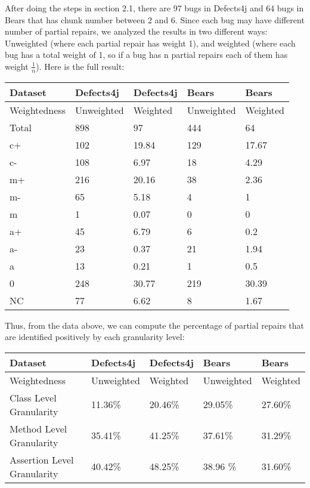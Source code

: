 \documentclass[sigconf, timestamp-false, anonymous=true]{acmart}
\begin{document}
After doing the steps in section 2.1, there are 97 bugs in Defects4j and 64 bugs in Bears that has chunk number between 2 and 6. Since each bug may have different number of partial repairs, we analyzed the results in two different ways: Unweighted (where each partial repair has weight 1), and weighted (where each bug has a total weight of 1, so if a bug has n partial repairs each of them has weight $\frac{1}{n}$). Here is the full result:

\begin{tabular}{| l | l | l | l | l |} \hline
    Dataset & Defects4j & Defects4j & Bears & Bears  \\ \hline
    Weightedness & Unweighted & Weighted & Unweighted & Weighted \\ \hline
    Total & 898 & 97 & 444 & 64 \\ \hline
    c+ & 102 & 19.84 & 129 & 17.67 \\
    c- & 108 & 6.97 & 18 & 4.29 \\
    m+ & 216 & 20.16 & 38 & 2.36 \\
    m- & 65 & 5.18 & 4 & 1 \\
    m~ & 1 & 0.07 & 0 & 0 \\
    a+ & 45 & 6.79 & 6 & 0.2 \\
    a- & 23 & 0.37 & 21 & 1.94 \\
    a~ & 13 & 0.21 & 1 & 0.5 \\
    0 & 248 & 30.77 & 219 & 30.39 \\
    NC & 77 & 6.62 & 8 & 1.67 \\
    \hline
    
    
    \end{tabular}
    
    Thus, from the data above, we can compute the percentage of partial repairs that are identified positively by each granularity level:
    
    \begin{tabular}{| l | l | l | l | l |} \hline
    Dataset & Defects4j & Defects4j & Bears & Bears  \\ \hline
    Weightedness & Unweighted & Weighted & Unweighted & Weighted \\ \hline
    Class Level Granularity & 11.36\% & 20.46\% & 29.05\% & 27.60\%\\
    Method Level Granularity & 35.41\% & 41.25\% & 37.61\% & 31.29\% \\
    Assertion Level Granularity & 40.42\% & 48.25\% & 38.96 \% & 31.60\% \\
    \hline
    
    \end{tabular}
\end{document}
